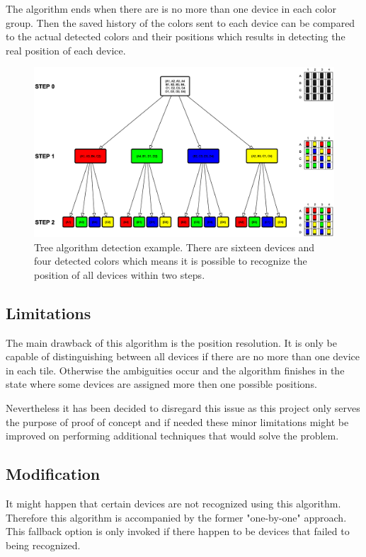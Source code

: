 The algorithm ends when there are is no more than one device in each color group. Then the saved history of the colors sent to each device can be compared to the actual detected colors and their positions which results in detecting the real position of each device.

\begin{figure}[H]
	\centering
		\includegraphics[width=21cm, angle=90]{sprint5/tree_algorithm.eps}
	\caption[Tree algorithm detection example]{Tree algorithm detection example. There are sixteen devices and four detected colors which means it is possible to recognize the position of all devices within two steps.}
	\label{fig:sprint5_tree_alg}
\end{figure}

\subsection{Limitations}
The main drawback of this algorithm is the position resolution. It is only be capable of distinguishing between all devices if there are no more than one device in each tile. Otherwise the ambiguities occur and the algorithm finishes in the state where some devices are assigned more then one possible positions.

Nevertheless it has been decided to disregard this issue as this project only serves the purpose of proof of concept and if needed these minor limitations might be improved on performing additional techniques that would solve the problem.

\subsection{Modification}
It might happen that certain devices are not recognized using this algorithm. Therefore this algorithm is accompanied by the former "one-by-one" approach. This fallback option is only invoked if there happen to be devices that failed to being recognized.

